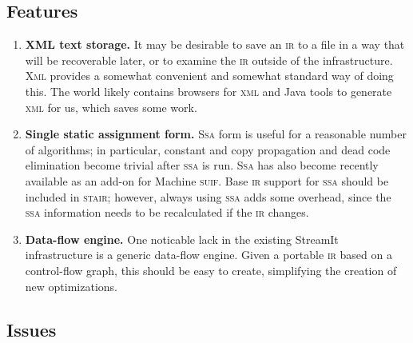\documentclass[11pt]{article}
\def\ir{\textsc{ir}}
\def\ssa{\textsc{ssa}}
\def\Ssa{\textsc{Ssa}}
\def\stair{\textsc{stair}}
\def\suif{\textsc{suif}}
\def\xml{\textsc{xml}}
\def\Xml{\textsc{Xml}}
\def\machsuif{Machine \suif}
\begin{document}
\subsection{Features}

\begin{enumerate}
\item \textbf{XML text storage.}  It may be desirable to save an \ir{}
  to a file in a way that will be recoverable later, or to examine the
  \ir{} outside of the infrastructure.  \Xml{} provides a somewhat
  convenient and somewhat standard way of doing this.  The world
  likely contains browsers for \xml{} and Java tools to generate
  \xml{} for us, which saves some work.
\item \textbf{Single static assignment form.}  \Ssa{} form is useful for
  a reasonable number of algorithms; in particular, constant and copy
  propagation and dead code elimination become trivial after \ssa{} is
  run.  \Ssa{} has also become recently available as an add-on for
  \machsuif.  Base \ir{} support for \ssa{} should be included in \stair;
  however, always using \ssa{} adds some overhead, since the \ssa{}
  information needs to be recalculated if the \ir{} changes.
\item \textbf{Data-flow engine.}  One noticable lack in the existing
  StreamIt infrastructure is a generic data-flow engine.  Given a
  portable \ir{} based on a control-flow graph, this should be easy to
  create, simplifying the creation of new optimizations.
\end{enumerate}

\subsection{Issues}
\end{document}
